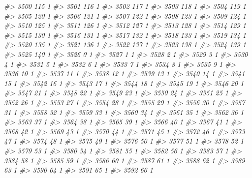 \documentclass[]{article}
\newenvironment{Shaded}{\begin{snugshade}}{\end{snugshade}}
\newcommand{\CommentTok}[1]{\textcolor[rgb]{0.56,0.35,0.01}{\textit{#1}}}
\begin{document}
\begin{Shaded}
\begin{Highlighting}[]
\CommentTok{#> 3500 115  1}
\CommentTok{#> 3501 116  1}
\CommentTok{#> 3502 117  1}
\CommentTok{#> 3503 118  1}
\CommentTok{#> 3504 119  1}
\CommentTok{#> 3505 120  1}
\CommentTok{#> 3506 121  1}
\CommentTok{#> 3507 122  1}
\CommentTok{#> 3508 123  1}
\CommentTok{#> 3509 124  1}
\CommentTok{#> 3510 125  1}
\CommentTok{#> 3511 126  1}
\CommentTok{#> 3512 127  1}
\CommentTok{#> 3513 128  1}
\CommentTok{#> 3514 129  1}
\CommentTok{#> 3515 130  1}
\CommentTok{#> 3516 131  1}
\CommentTok{#> 3517 132  1}
\CommentTok{#> 3518 133  1}
\CommentTok{#> 3519 134  1}
\CommentTok{#> 3520 135  1}
\CommentTok{#> 3521 136  1}
\CommentTok{#> 3522 137  1}
\CommentTok{#> 3523 138  1}
\CommentTok{#> 3524 139  1}
\CommentTok{#> 3525 140  1}
\CommentTok{#> 3526   0  1}
\CommentTok{#> 3527   1  1}
\CommentTok{#> 3528   2  1}
\CommentTok{#> 3529   3  1}
\CommentTok{#> 3530   4  1}
\CommentTok{#> 3531   5  1}
\CommentTok{#> 3532   6  1}
\CommentTok{#> 3533   7  1}
\CommentTok{#> 3534   8  1}
\CommentTok{#> 3535   9  1}
\CommentTok{#> 3536  10  1}
\CommentTok{#> 3537  11  1}
\CommentTok{#> 3538  12  1}
\CommentTok{#> 3539  13  1}
\CommentTok{#> 3540  14  1}
\CommentTok{#> 3541  15  1}
\CommentTok{#> 3542  16  1}
\CommentTok{#> 3543  17  1}
\CommentTok{#> 3544  18  1}
\CommentTok{#> 3545  19  1}
\CommentTok{#> 3546  20  1}
\CommentTok{#> 3547  21  1}
\CommentTok{#> 3548  22  1}
\CommentTok{#> 3549  23  1}
\CommentTok{#> 3550  24  1}
\CommentTok{#> 3551  25  1}
\CommentTok{#> 3552  26  1}
\CommentTok{#> 3553  27  1}
\CommentTok{#> 3554  28  1}
\CommentTok{#> 3555  29  1}
\CommentTok{#> 3556  30  1}
\CommentTok{#> 3557  31  1}
\CommentTok{#> 3558  32  1}
\CommentTok{#> 3559  33  1}
\CommentTok{#> 3560  34  1}
\CommentTok{#> 3561  35  1}
\CommentTok{#> 3562  36  1}
\CommentTok{#> 3563  37  1}
\CommentTok{#> 3564  38  1}
\CommentTok{#> 3565  39  1}
\CommentTok{#> 3566  40  1}
\CommentTok{#> 3567  41  1}
\CommentTok{#> 3568  42  1}
\CommentTok{#> 3569  43  1}
\CommentTok{#> 3570  44  1}
\CommentTok{#> 3571  45  1}
\CommentTok{#> 3572  46  1}
\CommentTok{#> 3573  47  1}
\CommentTok{#> 3574  48  1}
\CommentTok{#> 3575  49  1}
\CommentTok{#> 3576  50  1}
\CommentTok{#> 3577  51  1}
\CommentTok{#> 3578  52  1}
\CommentTok{#> 3579  53  1}
\CommentTok{#> 3580  54  1}
\CommentTok{#> 3581  55  1}
\CommentTok{#> 3582  56  1}
\CommentTok{#> 3583  57  1}
\CommentTok{#> 3584  58  1}
\CommentTok{#> 3585  59  1}
\CommentTok{#> 3586  60  1}
\CommentTok{#> 3587  61  1}
\CommentTok{#> 3588  62  1}
\CommentTok{#> 3589  63  1}
\CommentTok{#> 3590  64  1}
\CommentTok{#> 3591  65  1}
\CommentTok{#> 3592  66  1}

\end{Highlighting}
\end{Shaded}
\end{document}
